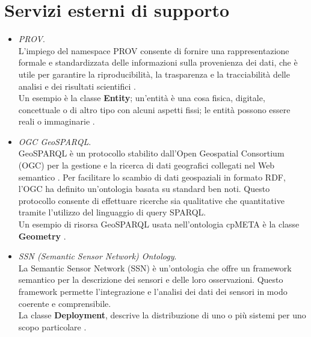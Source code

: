 \section{Servizi esterni di supporto}
\label{section:ontologiedisupporto}
\begin{itemize}
    \item \textit{PROV}.\\
    
    L'impiego del namespace PROV 
    consente di fornire una rappresentazione formale
    e standardizzata delle informazioni sulla
    provenienza dei dati, che è utile per garantire
    la riproducibilità, la trasparenza e la tracciabilità
    delle analisi e dei risultati scientifici \cite{PROVNamespace}.\\

    Un esempio è la classe \textbf{Entity};
    un'entità è una cosa fisica, digitale,
    concettuale o di altro tipo con alcuni aspetti fissi;
    le entità possono essere reali o immaginarie \cite{PROVEntity}.

    \item \textit{OGC GeoSPARQL}.\\
    
    GeoSPARQL è un protocollo stabilito
    dall'Open Geospatial Consortium (OGC)
    per la gestione e la ricerca di dati
    geografici collegati nel Web semantico \cite{OGCGeoSPARQL}.
    Per facilitare lo scambio di dati geospaziali
    in formato RDF, l'OGC ha definito un'ontologia
    basata su standard ben noti. Questo protocollo
    consente di effettuare ricerche sia qualitative
    che quantitative tramite l'utilizzo del linguaggio
    di query SPARQL.\\

    Un esempio di risorsa GeoSPARQL usata nell'ontologia cpMETA
    è la classe \textbf{Geometry} \cite{OGCGeoSPARQLGeometry}.

    \item \textit{SSN (Semantic Sensor Network) Ontology}.\\
    
    La Semantic Sensor Network (SSN) \cite{SSNOntology}
    è un'ontologia che offre un framework semantico
    per la descrizione dei sensori e delle loro
    osservazioni. Questo framework permette l'integrazione
    e l'analisi dei dati dei sensori in modo coerente e
    comprensibile.\\

    La classe \textbf{Deployment}, descrive la
    distribuzione di uno o più sistemi
    per uno scopo particolare \cite{SSNOntologyDeployment}.


\end{itemize}
